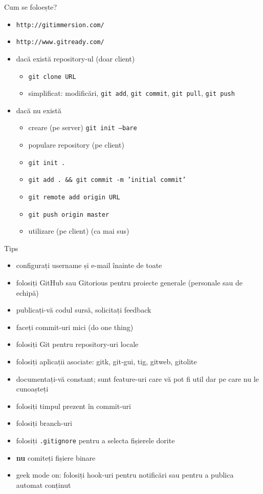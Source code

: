 \documentclass{beamer}
\begin{document}
\begin{frame}{Cum se foloește?}
  \begin{itemize}
    \item \texttt{http://gitimmersion.com/}
    \item \texttt{http://www.gitready.com/}
    \item dacă există repository-ul (doar client)
      \begin{itemize}
        \item \texttt{git clone URL}
        \item simplificat: modificări, \texttt{git add}, \texttt{git commit},
        \texttt{git pull}, \texttt{git push}
      \end{itemize}
    \item dacă nu există
      \begin{itemize}
        \item creare (pe server) \texttt{git init --bare}
        \item populare repository (pe client)
          \item \texttt{git init .}
          \item \texttt{git add . \&\& git commit -m 'initial commit'}
          \item \texttt{git remote add origin URL}
          \item \texttt{git push origin master}
        \item utilizare (pe client) (ca mai sus)
      \end{itemize}
  \end{itemize}
\end{frame}

\begin{frame}{Tips}
  \begin{itemize}
    \item configurați username și e-mail înainte de toate
    \item folosiți GitHub sau Gitorious pentru proiecte generale (personale
    sau de echipă)
    \item publicați-vă codul sursă, solicitați feedback
    \item faceți commit-uri mici (do one thing)
    \item folosiți Git pentru repository-uri locale
    \item folosiți aplicații asociate: gitk, git-gui, tig, gitweb, gitolite
    \item documentați-vă constant; sunt feature-uri care vă pot fi util dar pe
    care nu le cunoașteți
    \item folosiți timpul prezent în commit-uri
    \item folosiți branch-uri
    \item folosiți \texttt{.gitignore} pentru a selecta fișierele dorite
    \item \textbf{nu} comiteți fișiere binare
    \item geek mode on: folosiți hook-uri pentru notificări sau pentru a
    publica automat conținut
  \end{itemize}
\end{frame}
\end{document}
